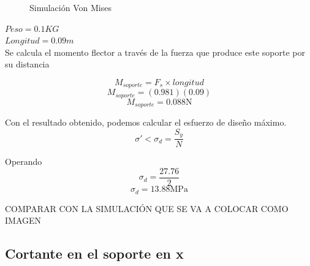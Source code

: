 \begin{figure}[H]
    \centering
    \caption{Simulación Von Mises }
    \label{fig:sim}
\end{figure}

$Peso =0.1 KG$\\
$Longitud=0.09 m$\\

Se calcula el momento flector a través de la fuerza que produce este soporte por su distancia

\[M_{soporte}=F_s\times longitud\]
\[M_{soporte}=(0.981)(0.09)\]
\[M_{soporte}=0.088 \text{N}\]

Con el resultado obtenido, podemos calcular el esfuerzo de diseño máximo.
\[\sigma'<\sigma_d=\frac{S_y}{N}\]

Operando
\[\sigma_d=\frac{27.76}{2}\]
\[\sigma_d=13.88\text{MPa}\]


COMPARAR CON LA SIMULACIÓN QUE SE VA A COLOCAR COMO IMAGEN

\subsection{Cortante en el soporte en x}\\


